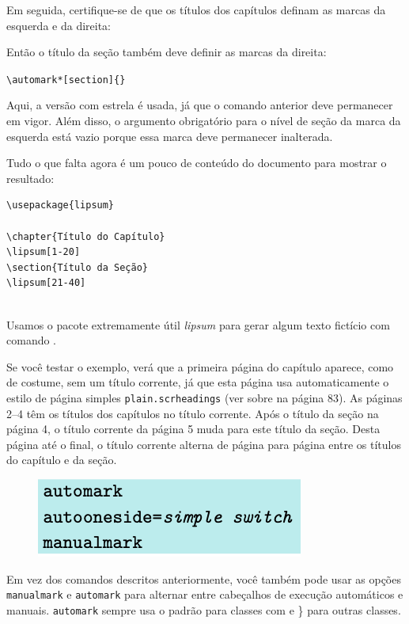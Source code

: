 Em seguida, certifique-se de que os títulos dos capítulos definam as marcas da esquerda e da direita: 

Então o título da seção também deve definir as marcas da direita:

\verb|\automark*[section]{}|

Aqui, a versão com estrela é usada, já que o comando  anterior deve permanecer em vigor. Além disso, o argumento obrigatório para o nível de seção da marca da esquerda está vazio porque essa marca deve permanecer inalterada.

Tudo o que falta agora é um pouco de conteúdo do documento para mostrar o resultado:
\begin{verbatim}
\usepackage{lipsum}

\chapter{Título do Capítulo}
\lipsum[1-20]
\section{Título da Seção}
\lipsum[21-40]
  
\end{verbatim}

Usamos o pacote extremamente útil \textit{lipsum} para gerar algum texto fictício com comando .

Se você testar o exemplo, verá que a primeira página do capítulo aparece, como de costume, sem um título corrente, já que esta página usa automaticamente o estilo de página simples \texttt{plain.scrheadings} (ver sobre  na página 83). As páginas 2–4 têm os títulos dos capítulos no título corrente. Após o título da seção na página 4, o título corrente da página 5 muda para este título da seção. Desta página até o final, o título corrente alterna de página para página entre os títulos do capítulo e da seção.

\begin{figure}[h]
    \centering
    \includegraphics[width=0.5\linewidth]{imagens/imagem07.png}
\end{figure}

Em vez dos comandos descritos anteriormente, você também pode usar as opções \texttt{manualmark} e \texttt{automark} para alternar entre cabeçalhos de execução automáticos e manuais. \texttt{automark} sempre usa o padrão  para classes com  e \} para outras classes.

